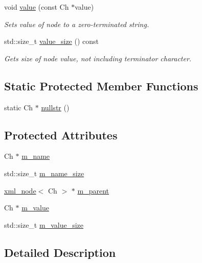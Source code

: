 \begin{DoxyCompactItemize}
void \mbox{\hyperlink{classrapidxml_1_1xml__base_a18c7469acdca771de9b4f3054053029c}{value}} (const Ch $\ast$value)
\begin{DoxyCompactList}\small\item\em Sets value of node to a zero-\/terminated string. \end{DoxyCompactList}\item 
std\+::size\+\_\+t \mbox{\hyperlink{classrapidxml_1_1xml__base_aa6981b3244607ea4ae7634f74f25361b}{value\+\_\+size}} () const
\begin{DoxyCompactList}\small\item\em Gets size of node value, not including terminator character. \end{DoxyCompactList}\end{DoxyCompactItemize}
\subsection*{Static Protected Member Functions}
\begin{DoxyCompactItemize}
\item 
static Ch $\ast$ \mbox{\hyperlink{classrapidxml_1_1xml__base_a641d0b8df8e0c3c7e0db06ced0e0749f}{nullstr}} ()
\end{DoxyCompactItemize}
\subsection*{Protected Attributes}
\begin{DoxyCompactItemize}
\item 
Ch $\ast$ \mbox{\hyperlink{classrapidxml_1_1xml__base_a23053aafada985ece680d52694c63cdc}{m\+\_\+name}}
\item 
std\+::size\+\_\+t \mbox{\hyperlink{classrapidxml_1_1xml__base_af67d7df13abd2eb30036a801b87d6f81}{m\+\_\+name\+\_\+size}}
\item 
\mbox{\hyperlink{classrapidxml_1_1xml__node}{xml\+\_\+node}}$<$ Ch $>$ $\ast$ \mbox{\hyperlink{classrapidxml_1_1xml__base_a1b2fdbb90cc0cc9135a8311c40d79bf9}{m\+\_\+parent}}
\item 
Ch $\ast$ \mbox{\hyperlink{classrapidxml_1_1xml__base_a8fbc9ba6b320f64f4bdab09469a9e623}{m\+\_\+value}}
\item 
std\+::size\+\_\+t \mbox{\hyperlink{classrapidxml_1_1xml__base_a643295fc68623ed58e2db3551d44fef0}{m\+\_\+value\+\_\+size}}
\end{DoxyCompactItemize}


\subsection{Detailed Description}

